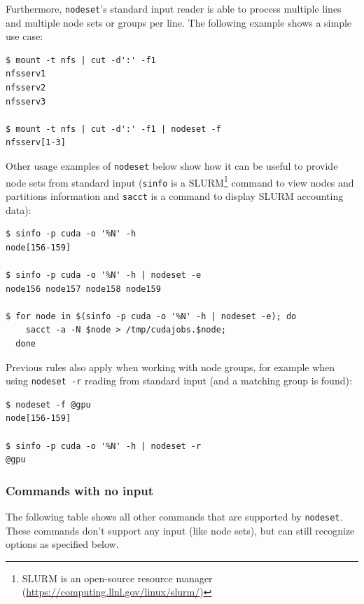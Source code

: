 \documentclass[english,a4paper]{csuserguide}
\newcommand{\nodeset}{\texttt{nodeset}\xspace}
\begin{document}
\label{nodeset-stdin}
Furthermore, \nodeset's standard input reader is able to process multiple lines and multiple node sets or groups per line. The following example shows a simple use case:
\bigskip

\begin{lstlisting}[breaklines=true, breakatwhitespace=true] 
$ mount -t nfs | cut -d':' -f1
nfsserv1
nfsserv2
nfsserv3

$ mount -t nfs | cut -d':' -f1 | nodeset -f
nfsserv[1-3]
\end{lstlisting}


Other usage examples of \nodeset below show how it can be useful to provide node sets from standard input (\verb+sinfo+ is a SLURM\footnote{SLURM is an open-source resource manager (\url{https://computing.llnl.gov/linux/slurm/})} command to view nodes and partitions information and \verb+sacct+ is a command to display SLURM accounting data):
\bigskip

\begin{lstlisting}[breaklines=true, breakatwhitespace=true] 
$ sinfo -p cuda -o '%N' -h
node[156-159]

$ sinfo -p cuda -o '%N' -h | nodeset -e
node156 node157 node158 node159

$ for node in $(sinfo -p cuda -o '%N' -h | nodeset -e); do
	sacct -a -N $node > /tmp/cudajobs.$node;
  done

\end{lstlisting}

Previous rules also apply when working with node groups, for example when using \verb+nodeset -r+ reading from standard input (and a matching group is found):
\medskip
\begin{lstlisting}[breaklines=true, breakatwhitespace=true] 
$ nodeset -f @gpu
node[156-159]

$ sinfo -p cuda -o '%N' -h | nodeset -r
@gpu
\end{lstlisting}


\subsubsection{Commands with no input}

The following table shows all other commands that are supported by \nodeset. These commands don't support any input (like node sets), but can still recognize options as specified below.
\label{nodeset-grpcmd}
\end{document}
